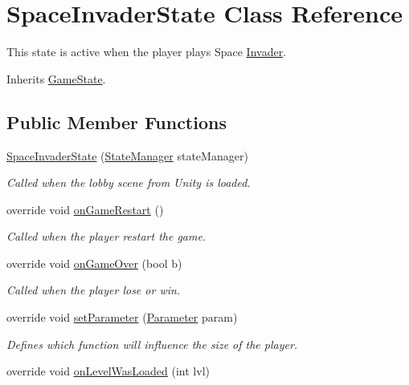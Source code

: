 \hypertarget{class_space_invader_state}{\section{Space\-Invader\-State Class Reference}
\label{class_space_invader_state}
}


This state is active when the player plays Space \hyperlink{class_invader}{Invader}. 




Inherits \hyperlink{class_game_state}{Game\-State}.

\subsection*{Public Member Functions}
\begin{DoxyCompactItemize}
\item 
\hyperlink{class_space_invader_state_a0dd267e6c77643e39ccc6b8e90639fe5}{Space\-Invader\-State} (\hyperlink{class_state_manager}{State\-Manager} state\-Manager)
\begin{DoxyCompactList}\small\item\em Called when the lobby scene from Unity is loaded.\end{DoxyCompactList}\item 
override void \hyperlink{class_space_invader_state_a573f37d8d8d67b76729211b0f0b53bc9}{on\-Game\-Restart} ()
\begin{DoxyCompactList}\small\item\em Called when the player restart the game.\end{DoxyCompactList}\item 
override void \hyperlink{class_space_invader_state_a0dbf1355f74cc72d3c88de04ed4b0850}{on\-Game\-Over} (bool b)
\begin{DoxyCompactList}\small\item\em Called when the player lose or win.\end{DoxyCompactList}\item 
override void \hyperlink{class_space_invader_state_a76aea6ddbecbc48831eaf643074dc218}{set\-Parameter} (\hyperlink{class_parameter}{Parameter} param)
\begin{DoxyCompactList}\small\item\em Defines which function will influence the size of the player.\end{DoxyCompactList}\item 
override void \hyperlink{class_space_invader_state_a4682e573bfed319344164f0c2ac92c0e}{on\-Level\-Was\-Loaded} (int lvl)

\end{DoxyCompactItemize}
